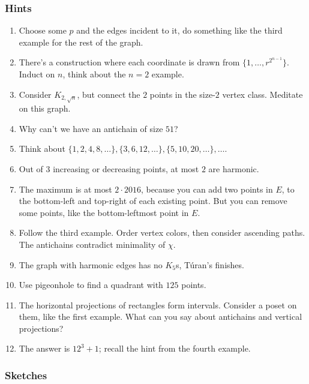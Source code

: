 \documentclass[11pt,paper=letter]{scrartcl}
\begin{document}
\pagebreak
\subsubsection*{Hints}

\begin{enumerate}
\item \label{h:8} Choose some $p$ and the edges incident to it, do something like the third example for the rest of the graph.
\item \label{h:4} There's a construction where each coordinate is drawn from $\{1, \ldots, r^{2^{n-1}}\}$. Induct on $n$, think about the $n = 2$ example.
\item \label{h:10} Consider $K_{2, \sqrt{n}}$, but connect the $2$ points in the size-$2$ vertex class. Meditate on this graph.
\item \label{h:1} Why can't we have an antichain of size $51$?
\item \label{h:9} Think about $\{1, 2, 4, 8, \ldots\}, \{3, 6, 12, \ldots\}, \{5, 10, 20, \ldots\}, \ldots$.
\item \label{h:6} Out of $3$ increasing or decreasing points, at most $2$ are harmonic.
\item \label{h:11} The maximum is at most $2 \cdot 2016$, because you can add two points in $E$, to the bottom-left and top-right of each existing point. But you can remove some points, like the bottom-leftmost point in $E$.
\item \label{h:3} Follow the third example. Order vertex colors, then consider ascending paths. The antichains contradict minimality of $\chi$.
\item \label{h:7} The graph with harmonic edges has no $K_5$s, T\'uran's finishes.
\item \label{h:5} Use pigeonhole to find a quadrant with $125$ points.
\item \label{h:2} The horizontal projections of rectangles form intervals. Consider a poset on them, like the first example. What can you say about antichains and vertical projections?
\item \label{h:12} The answer is $12^3 + 1$; recall the hint from the fourth example.
\end{enumerate}

\subsubsection*{Sketches}
\end{document}
